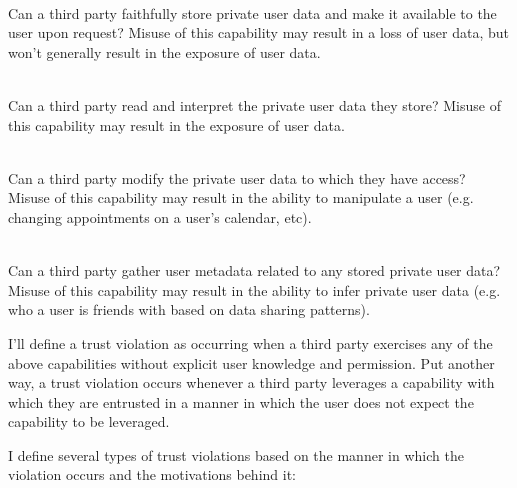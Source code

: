 \begin{packed_desc}
\item[Storage (S):] \hfill \\
  Can a third party faithfully store private user data and make it
  available to the user upon request? Misuse of this capability may
  result in a loss of user data, but won't generally result in the
  exposure of user data.
\item[Access (R):] \hfill \\
  Can a third party read and interpret the private user data they
  store? Misuse of this capability may result in the exposure of user
  data.
\item[Manipulation (W):] \hfill \\ Can a third party modify the
  private user data to which they have access? Misuse of this
  capability may result in the ability to manipulate a user
  (e.g. changing appointments on a user's calendar, etc).
\item[Meta-analysis (M):] \hfill \\
  Can a third party gather user metadata related to any stored private
  user data? Misuse of this capability may result in the ability to
  infer private user data (e.g. who a user is friends with based on
  data sharing patterns).
\end{packed_desc}

I'll define a trust violation as occurring when a third party
exercises any of the above capabilities without explicit user
knowledge and permission. Put another way, a trust violation occurs
whenever a third party leverages a capability with which they are
entrusted in a manner in which the user does not expect the capability
to be leveraged.

I define several types of trust violations based on the manner in
which the violation occurs and the motivations behind it:

